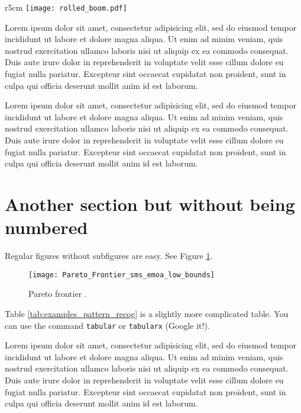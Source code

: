 \begin{wrapfigure}{r}{5cm}
	\centering
	\texttt{[image: rolled\_boom.pdf]}
	\caption{Example figure.}
	\label{fig:example_figure}
\end{wrapfigure}

Lorem ipsum dolor sit amet, consectetur adipisicing elit, sed do eiusmod tempor incididunt ut labore et dolore magna aliqua. Ut enim ad minim veniam, quis nostrud exercitation ullamco laboris nisi ut aliquip ex ea commodo consequat. Duis aute irure dolor in reprehenderit in voluptate velit esse cillum dolore eu fugiat nulla pariatur. Excepteur sint occaecat cupidatat non proident, sunt in culpa qui officia deserunt mollit anim id est laborum.

Lorem ipsum dolor sit amet, consectetur adipisicing elit, sed do eiusmod tempor incididunt ut labore et dolore magna aliqua. Ut enim ad minim veniam, quis nostrud exercitation ullamco laboris nisi ut aliquip ex ea commodo consequat. Duis aute irure dolor in reprehenderit in voluptate velit esse cillum dolore eu fugiat nulla pariatur. Excepteur sint occaecat cupidatat non proident, sunt in culpa qui officia deserunt mollit anim id est laborum.

\section*{Another section but without being numbered}

Regular figures without subfigures are easy. See Figure \ref{fig:Genetic_optimization_Pareto}.

\begin{figure}[htb]
	\centering
	\texttt{[image: Pareto\_Frontier\_sms\_emoa\_low\_bounds]}
	\caption{Pareto frontier \cite{bessa2018a}.}
	\label{fig:Genetic_optimization_Pareto}
\end{figure}

Table \ref{tab:examples_pattern_recog} is a slightly more complicated table. You can use the command \texttt{tabular} or \texttt{tabularx} (Google it!).

Lorem ipsum dolor sit amet, consectetur adipisicing elit, sed do eiusmod tempor incididunt ut labore et dolore magna aliqua. Ut enim ad minim veniam, quis nostrud exercitation ullamco laboris nisi ut aliquip ex ea commodo consequat. Duis aute irure dolor in reprehenderit in voluptate velit esse cillum dolore eu fugiat nulla pariatur. Excepteur sint occaecat cupidatat non proident, sunt in culpa qui officia deserunt mollit anim id est laborum.


